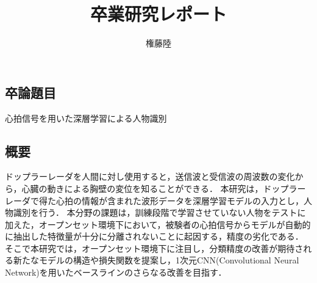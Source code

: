 \documentclass[dvipdfmx]{jsarticle}
\begin{document}
\title{卒業研究レポート}
\author{権藤陸}
\maketitle
\subsection*{卒論題目}
心拍信号を用いた深層学習による人物識別
\subsection*{概要}
ドップラーレーダを人間に対し使用すると，送信波と受信波の周波数の変化から，心臓の動きによる胸壁の変位を知ることができる．
本研究は，ドップラーレーダで得た心拍の情報が含まれた波形データを深層学習モデルの入力とし，人物識別を行う．
本分野の課題は，訓練段階で学習させていない人物をテストに加えた，オープンセット環境下において，被験者の心拍信号からモデルが自動的に抽出した特徴量が十分に分離されないことに起因する，精度の劣化である．
そこで本研究では，オープンセット環境下に注目し，分類精度の改善が期待される新たなモデルの構造や損失関数を提案し，1次元CNN(Convolutional Neural Network)を用いたベースラインのさらなる改善を目指す．
\end{document}
